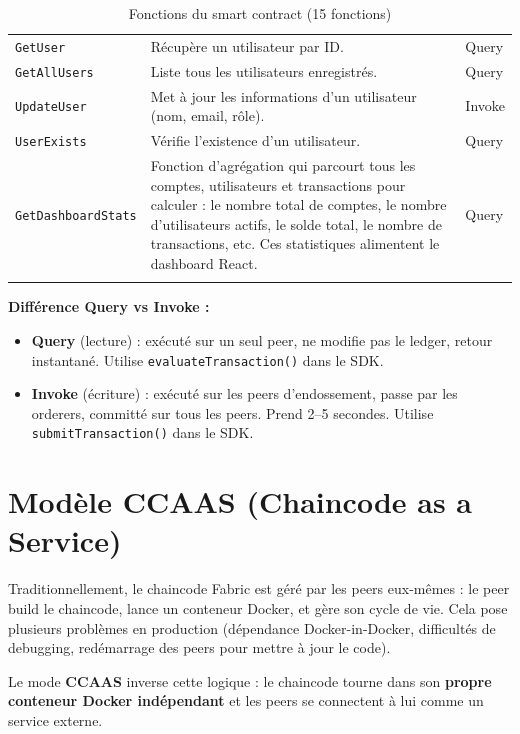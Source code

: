 \documentclass[12pt,a4paper,twoside]{report}
\begin{document}
\begin{longtable}{lp{7cm}l}
\texttt{GetUser} & Récupère un utilisateur par ID. & Query \\
\texttt{GetAllUsers} & Liste tous les utilisateurs enregistrés. & Query \\
\texttt{UpdateUser} & Met à jour les informations d'un utilisateur (nom, email, rôle). & Invoke \\
\texttt{UserExists} & Vérifie l'existence d'un utilisateur. & Query \\
\texttt{GetDashboardStats} & Fonction d'agrégation qui parcourt tous les comptes, utilisateurs et transactions pour calculer : le nombre total de comptes, le nombre d'utilisateurs actifs, le solde total, le nombre de transactions, etc. Ces statistiques alimentent le dashboard React. & Query \\
\bottomrule
\caption{Fonctions du smart contract (15 fonctions)}
\end{longtable}

\begin{warningbox}
\textbf{Différence Query vs Invoke :}
\begin{itemize}
    \item \textbf{Query} (lecture) : exécuté sur un seul peer, ne modifie pas le ledger, retour instantané. Utilise \texttt{evaluateTransaction()} dans le SDK.
    \item \textbf{Invoke} (écriture) : exécuté sur les peers d'endossement, passe par les orderers, committé sur tous les peers. Prend 2--5 secondes. Utilise \texttt{submitTransaction()} dans le SDK.
\end{itemize}
\end{warningbox}

\section{Modèle CCAAS (Chaincode as a Service)}

Traditionnellement, le chaincode Fabric est géré par les peers eux-mêmes : le peer build le chaincode, lance un conteneur Docker, et gère son cycle de vie. Cela pose plusieurs problèmes en production (dépendance Docker-in-Docker, difficultés de debugging, redémarrage des peers pour mettre à jour le code).

Le mode \textbf{CCAAS} inverse cette logique : le chaincode tourne dans son \textbf{propre conteneur Docker indépendant} et les peers se connectent à lui comme un service externe.
\end{document}
